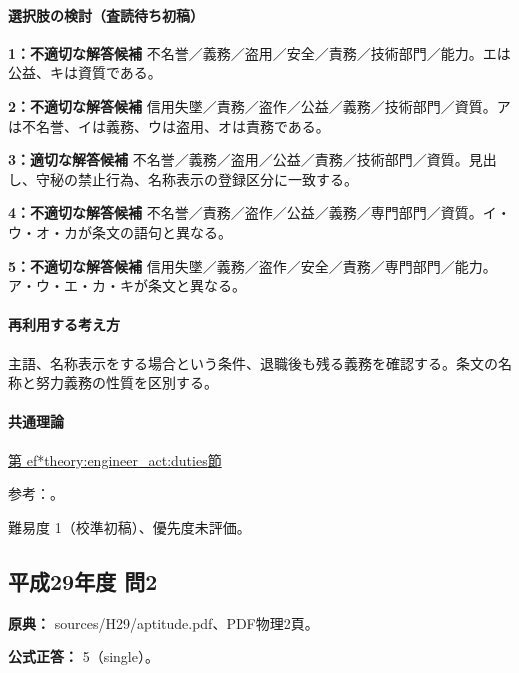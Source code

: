 \paragraph{選択肢の検討（査読待ち初稿）}

\noindent\textbf{1：不適切な解答候補} 不名誉／義務／盗用／安全／責務／技術部門／能力。エは公益、キは資質である。\par

\noindent\textbf{2：不適切な解答候補} 信用失墜／責務／盗作／公益／義務／技術部門／資質。アは不名誉、イは義務、ウは盗用、オは責務である。\par

\noindent\textbf{3：適切な解答候補} 不名誉／義務／盗用／公益／責務／技術部門／資質。見出し、守秘の禁止行為、名称表示の登録区分に一致する。\par

\noindent\textbf{4：不適切な解答候補} 不名誉／責務／盗作／公益／義務／専門部門／資質。イ・ウ・オ・カが条文の語句と異なる。\par

\noindent\textbf{5：不適切な解答候補} 信用失墜／義務／盗作／安全／責務／専門部門／能力。ア・ウ・エ・カ・キが条文と異なる。\par

\paragraph{再利用する考え方} 主語、名称表示をする場合という条件、退職後も残る義務を確認する。条文の名称と努力義務の性質を区別する。

\paragraph{共通理論} \hyperref[theory:engineer_act:duties]{第
ef*{theory:engineer_act:duties}節}

\par 参考：\cite{engineer_act_current}。

\par 難易度 1（校準初稿）、優先度未評価。

\subsection{平成29年度 問2}
\label{q:h29-reg-apt-02}

\noindent\textbf{原典：} sources/H29/aptitude.pdf、PDF物理2頁。

\textbf{公式正答：} 5（single）。

